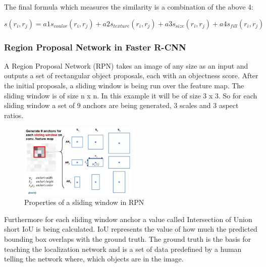 \vspace{0.25cm} \noindent
The final formula which measures the similarity is a combination of the above 4:
\vspace{0.25cm} \noindent
\begin{center}
    \begin{equation*}
        s(r_i,r_j) = a1s_{coulor}(r_i,r_j) + a2s_{texture}(r_i,r_j) + a3s_{size}(r_i,r_j) + a4s_{fill}(r_i,r_j)
    \end{equation*}\cite{selectivesearch}
\end{center}
\vspace{0.25cm} \noindent
\subsubsection{Region Proposal Network in Faster R-CNN}
A Region Proposal Network (RPN) takes an image of any size as an input and outputs a set of rectangular object proposals, each with an
objectness score. After the initial proposals, a sliding window is being run over the feature map. The sliding
window is of size n x n. In this example it will be of size 3 x 3. So for each sliding window a set of 9 anchors are being generated, 3
scales and 3 aspect ratios.\cite{fasterrcnn}
\vspace{0.25cm} \noindent
\begin{figure}[!hbt]
    \caption{Properties of a sliding window in RPN}
    \begin{center}
        \includegraphics[width=0.5\textwidth]{images/object_detection/rpn_anchors.png}
    \end{center}
\end{figure}
\vspace{0.25cm} \noindent
Furthermore for each sliding window anchor a value called Intersection of Union short IoU is being calculated. IoU represents the value of how
much the predicted bounding box overlaps with the ground truth. The ground truth is the basis for teaching the localization network and is a
set of data predefined by a human telling the network where, which objects are in the image.\cite{fasterrcnn} \\ \\
